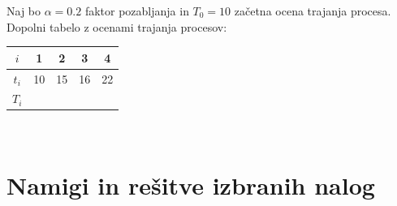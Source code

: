 \begin{Exercise}
Naj bo $\alpha=0.2$ faktor pozabljanja in $T_0=10$ začetna ocena trajanja procesa. Dopolni tabelo z ocenami trajanja procesov:
\par
{\centering
	\begin{tabular}{c|cccc}
	$i$    & 1 & 2 & 3 & 4 \\ 
	\hline
	$t_i$ & 10  & 15 & 16 & 22\\
	$T_i$ & & & & \\
	\end{tabular}\\
}
\end{Exercise}


\section{Namigi in rešitve izbranih nalog}

\shipoutAnswer
